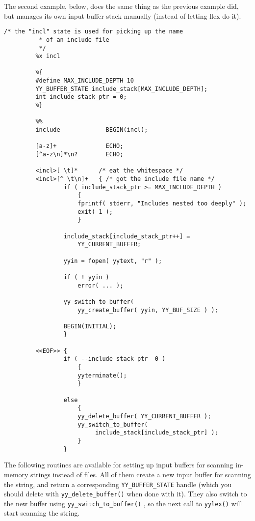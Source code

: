 \documentclass[openany,oneside]{book}
\begin{document}
The second example, below, does the same thing as the previous example did, but
manages its own input buffer stack manually (instead of letting flex do it).


\begin{verbatim}
/* the "incl" state is used for picking up the name
          * of an include file
          */
         %x incl
     
         %{
         #define MAX_INCLUDE_DEPTH 10
         YY_BUFFER_STATE include_stack[MAX_INCLUDE_DEPTH];
         int include_stack_ptr = 0;
         %}
     
         %%
         include             BEGIN(incl);
     
         [a-z]+              ECHO;
         [^a-z\n]*\n?        ECHO;
     
         <incl>[ \t]*      /* eat the whitespace */
         <incl>[^ \t\n]+   { /* got the include file name */
                 if ( include_stack_ptr >= MAX_INCLUDE_DEPTH )
                     {
                     fprintf( stderr, "Includes nested too deeply" );
                     exit( 1 );
                     }
     
                 include_stack[include_stack_ptr++] =
                     YY_CURRENT_BUFFER;
     
                 yyin = fopen( yytext, "r" );
     
                 if ( ! yyin )
                     error( ... );
     
                 yy_switch_to_buffer(
                     yy_create_buffer( yyin, YY_BUF_SIZE ) );
     
                 BEGIN(INITIAL);
                 }
     
         <<EOF>> {
                 if ( --include_stack_ptr  0 )
                     {
                     yyterminate();
                     }
     
                 else
                     {
                     yy_delete_buffer( YY_CURRENT_BUFFER );
                     yy_switch_to_buffer(
                          include_stack[include_stack_ptr] );
                     }
                 }
\end{verbatim}


The following routines are available for setting up input buffers for
scanning in-memory strings instead of files.  All of them create a new
input buffer for scanning the string, and return a corresponding \verb`YY_BUFFER_STATE` handle (which you should delete with \verb`yy_delete_buffer()` when done with it).  They also switch to the
new buffer using \verb`yy_switch_to_buffer()` , so the next call to \verb`yylex()` will start scanning the string.
\end{document}
